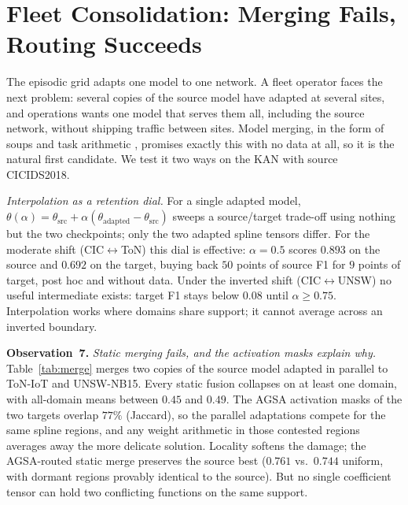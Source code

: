 \documentclass[10pt, conference, letterpaper]{IEEEtran}
\newcommand{\obs}[1]{\vspace{2pt}\noindent\textbf{Observation~#1.}}
\begin{document}
\section{Fleet Consolidation: Merging Fails, Routing Succeeds}
\label{sec:merge}




The episodic grid adapts one model to one network. A fleet operator
faces the next problem: several copies of the source model have
adapted at several sites, and operations wants one model that serves
them all, including the source network, without shipping traffic
between sites. Model merging, in the form of soups
\cite{wortsman2022soups} and task arithmetic \cite{ilharco2023task},
promises exactly this with no data at all, so it is the natural first
candidate. We test it two ways on the KAN with source CICIDS2018.

\emph{Interpolation as a retention dial.} For a single adapted model,
$\theta(\alpha)=\theta_{\text{src}}+\alpha(\theta_{\text{adapted}}
-\theta_{\text{src}})$ sweeps a source/target trade-off using nothing
but the two checkpoints; only the two adapted spline tensors differ.
For the moderate shift (CIC$\leftrightarrow$ToN) this dial is
effective: $\alpha{=}0.5$ scores $0.893$ on the source and $0.692$ on
the target, buying back $50$ points of source F1 for $9$ points of
target, post hoc and without data. Under the inverted shift
(CIC$\leftrightarrow$UNSW) no useful intermediate exists: target F1
stays below $0.08$ until $\alpha\geq 0.75$. Interpolation works where
domains share support; it cannot average across an inverted boundary.

\obs{7} \emph{Static merging fails, and the activation masks explain
why.} Table~\ref{tab:merge} merges two copies of the source model
adapted in parallel to ToN-IoT and UNSW-NB15. Every static fusion
collapses on at least one domain, with all-domain means between $0.45$
and $0.49$. The AGSA activation masks of the two targets overlap
$77\%$ (Jaccard), so the parallel adaptations compete for the same
spline regions, and any weight arithmetic in those contested regions
averages away the more delicate solution. Locality softens the damage;
the AGSA-routed static merge preserves the source best ($0.761$ vs.\
$0.744$ uniform, with dormant regions provably identical to the
source). But no single coefficient tensor can hold two conflicting
functions on the same support.
\end{document}

